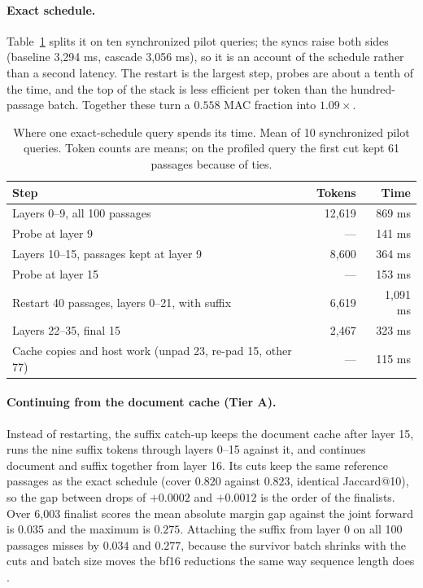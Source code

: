 \documentclass[11pt, a4paper]{article}
\begin{document}
\paragraph{Exact schedule.}
Table~\ref{tab:parts} splits it on ten synchronized pilot queries; the syncs raise both sides (baseline 3,294 ms, cascade 3,056 ms), so it is an account of the schedule rather than a second latency.
The restart is the largest step, probes are about a tenth of the time, and the top of the stack is less efficient per token than the hundred-passage batch.
Together these turn a $0.558$ MAC fraction into $1.09\times$.

\begin{table}[t]
\centering
\caption{Where one exact-schedule query spends its time. Mean of 10 synchronized pilot queries. Token counts are means; on the profiled query the first cut kept 61 passages because of ties.}
\label{tab:parts}
\begin{tabular}{lrr}
\toprule
Step & Tokens & Time \\
\midrule
Layers 0--9, all 100 passages & 12,619 & 869 ms \\
Probe at layer 9 & --- & 141 ms \\
Layers 10--15, passages kept at layer 9 & 8,600 & 364 ms \\
Probe at layer 15 & --- & 153 ms \\
Restart 40 passages, layers 0--21, with suffix & 6,619 & 1,091 ms \\
Layers 22--35, final 15 & 2,467 & 323 ms \\
Cache copies and host work (unpad 23, re-pad 15, other 77) & --- & 115 ms \\
\bottomrule
\end{tabular}
\end{table}

\paragraph{Continuing from the document cache (Tier A).}
Instead of restarting, the suffix catch-up keeps the document cache after layer 15, runs the nine suffix tokens through layers 0--15 against it, and continues document and suffix together from layer 16.
Its cuts keep the same reference passages as the exact schedule (cover $0.820$ against $0.823$, identical Jaccard@10), so the gap between drops of $+0.0002$ and $+0.0012$ is the order of the finalists.
Over 6,003 finalist scores the mean absolute margin gap against the joint forward is $0.035$ and the maximum is $0.275$.
Attaching the suffix from layer 0 on all 100 passages misses by $0.034$ and $0.277$, because the survivor batch shrinks with the cuts and batch size moves the bf16 reductions the same way sequence length does \cite{he2025nondeterminism}.
\end{document}
